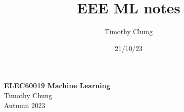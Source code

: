 \documentclass{report}
\title{EEE ML notes}
\author{Timothy Chung}
\date{21/10/23}
\begin{document}


\begin{titlepage}
    \centering
    \vspace*{1cm}
    \Huge
    \textbf{ELEC60019 Machine Learning} \\
    \vspace{1cm}
    \Large
    Timothy Chung \\
    \vspace{1cm}
    Autumn 2023 \\
    \vfill
\end{titlepage}

\setcounter{tocdepth}{1}
\tableofcontents
\newpage

% 







\end{document}
